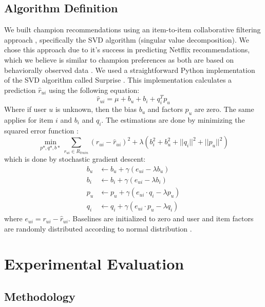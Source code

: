 \documentclass [11pt]{IEEEtran}
\begin{document}
\subsection{Algorithm Definition}
We built champion recommendations using an item-to-item collaborative filtering approach \cite{Sarwar:2001}, specifically the SVD algorithm (singular value decomposition). We chose this approach due to it's success in predicting Netflix recommendations, which we believe is similar to champion preferences as both are based on behaviorally observed data \cite{paterek2007improving}. We used a straightforward Python implementation of the SVD algorithm called Surprise \cite{Surprise}. \midskip
This implementation calculates a prediction $\hat{r}_{ui}$ using the following equation:
$$
    \hat{r}_{ui} = \mu + b_u + b_i + q_i^Tp_u
$$
Where if user $u$ is unknown, then the bias $b_u$ and factors $p_u$ are zero. The same applies for item $i$ and $b_i$ and $q_i$. The estimations are done by minimizing the squared error function
\cite{koren2009matrix} :
$$
    \min_{p*,q*,b*} \sum_{r_{ui} \in R_{train}} \left(r_{ui} - \hat{r}_{ui} \right)^2 + 
\lambda\left(b_i^2 + b_u^2 + ||q_i||^2 + ||p_u||^2\right)
$$
which is done by stochastic gradient descent:
\begin{align*}
b_u &\leftarrow b_u + \gamma (e_{ui} - \lambda b_u)\\
b_i &\leftarrow b_i + \gamma (e_{ui} - \lambda b_i)\\
p_u &\leftarrow p_u + \gamma (e_{ui} \cdot q_i - \lambda p_u)\\
q_i &\leftarrow q_i + \gamma (e_{ui} \cdot p_u - \lambda q_i)
\end{align*}
where $e_{ui} = r_{ui} - \hat{r}_{ui}$. Baselines are initialized to zero and user and item factors are randomly distributed according to normal distribution \cite{Surprise}.
\section{Experimental Evaluation}
\subsection{Methodology}
\end{document}
